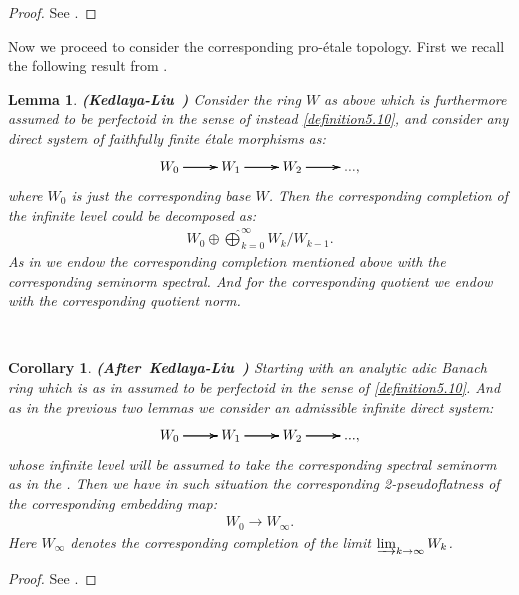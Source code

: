 \documentclass[12pt]{amsart}
\newtheorem{lemma}[theorem]{Lemma}
\newtheorem{corollary}[theorem]{Corollary}
\theoremstyle{definition}
\numberwithin{equation}{section}
\begin{document}
\begin{proof}
See \cite[Proposition 3.4.3]{KL2}.	
\end{proof}


\indent Now we proceed to consider the corresponding pro-\'etale topology. First we recall the following result from \cite[Lemma 3.4.4]{KL2}.


\begin{lemma}  \mbox{\bf{(Kedlaya-Liu \cite[Lemma 3.4.4]{KL2})}}
Consider the ring $W$ as above which is furthermore assumed to be perfectoid in the sense of instead \cref{definition5.10}, and consider any direct system of faithfully finite \'etale morphisms as:
\[
\xymatrix@C+0pc@R+0pc{
W_0 \ar[r] \ar[r] \ar[r] &W_1 \ar[r] \ar[r] \ar[r] &W_2  \ar[r] \ar[r] \ar[r] &...,   
}
\]	
where $W_0$ is just the corresponding base $W$. Then the corresponding completion of the infinite level could be decomposed as:
\begin{align}
W_0\oplus\widehat{\bigoplus}_{k=0}^\infty W_k/W_{k-1}.	
\end{align}
As in \cite[Lemma 3.4.4]{KL2} we endow the corresponding completion mentioned above with the corresponding seminorm spectral. And for the corresponding quotient we endow with the corresponding quotient norm.
\end{lemma}


\



\begin{corollary}\mbox{\bf{(After Kedlaya-Liu \cite[Corollary 3.4.5]{KL2})}} 
Starting with an analytic adic Banach ring which is as in \cite[Corollary 3.4.5]{KL2} assumed to be perfectoid in the sense of \cref{definition5.10}. And as in the previous two lemmas we consider an admissible infinite direct system:
\[
\xymatrix@C+0pc@R+0pc{
W_{0} \ar[r] \ar[r] \ar[r] &W_{1} \ar[r] \ar[r] \ar[r] &W_{2}  \ar[r] \ar[r] \ar[r] &...,   
}
\]
whose infinite level will be assumed to take the corresponding spectral seminorm as in the \cite[Corollary 3.4.5]{KL2}. Then we have in such situation the corresponding 2-pseudoflatness of the corresponding embedding map:
\begin{align}
W_{0}\rightarrow W_{\infty}.
\end{align}
Here $W_{\infty}$ denotes the corresponding completion of the limit $\varinjlim_{k\rightarrow\infty}W_{k}$.
\end{corollary}


\begin{proof}
See \cite[Corollary 3.4.5]{KL2}.	
\end{proof}
\end{document}
